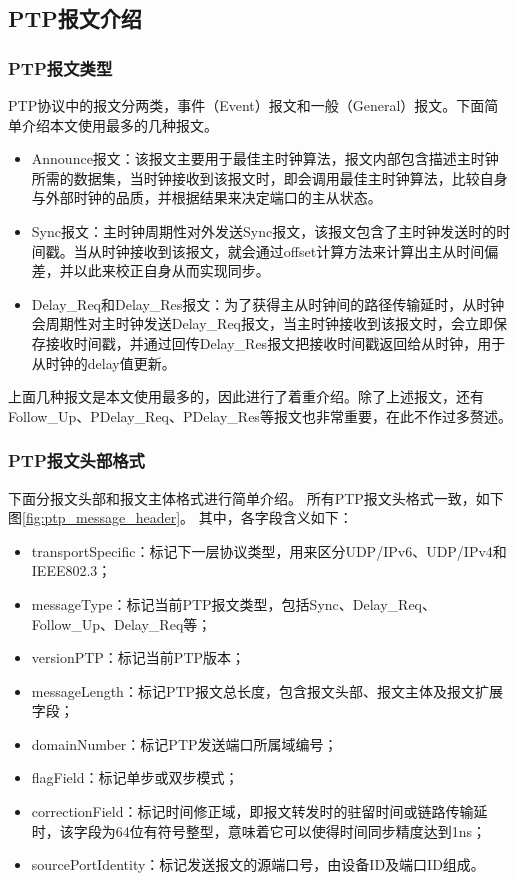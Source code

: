 \subsection{PTP报文介绍}
\subsubsection{PTP报文类型}
PTP协议中的报文分两类，事件（Event）报文和一般（General）报文。下面简单介绍本文使用最多的几种报文。
\begin{itemize}[noitemsep,topsep=0pt,parsep=0pt,partopsep=0pt]
	\item Announce报文：该报文主要用于最佳主时钟算法，报文内部包含描述主时钟所需的数据集，当时钟接收到该报文时，即会调用最佳主时钟算法，比较自身与外部时钟的品质，并根据结果来决定端口的主从状态\supercite{52}。
	\item Sync报文：主时钟周期性对外发送Sync报文，该报文包含了主时钟发送时的时间戳。当从时钟接收到该报文，就会通过offset计算方法来计算出主从时间偏差，并以此来校正自身从而实现同步\supercite{52}。
	\item Delay\_Req和Delay\_Res报文：为了获得主从时钟间的路径传输延时，从时钟会周期性对主时钟发送Delay\_Req报文，当主时钟接收到该报文时，会立即保存接收时间戳，并通过回传Delay\_Res报文把接收时间戳返回给从时钟，用于从时钟的delay值更新\supercite{52}。
\end{itemize}
上面几种报文是本文使用最多的，因此进行了着重介绍。除了上述报文，还有Follow\_Up、PDelay\_Req、PDelay\_Res等报文也非常重要，在此不作过多赘述。

\subsubsection{PTP报文头部格式}
下面分报文头部和报文主体格式进行简单介绍。
所有PTP报文头格式一致，如下图\ref{fig:ptp_message_header}。
其中，各字段含义如下：
\begin{itemize}[noitemsep,topsep=0pt,parsep=0pt,partopsep=0pt]
	\item transportSpecific：标记下一层协议类型，用来区分UDP/IPv6、UDP/IPv4和IEEE802.3；
	\item messageType：标记当前PTP报文类型，包括Sync、Delay\_Req、Follow\_Up、Delay\_Req等；
	\item versionPTP：标记当前PTP版本；
	\item messageLength：标记PTP报文总长度，包含报文头部、报文主体及报文扩展字段；
	\item domainNumber：标记PTP发送端口所属域编号；
	\item flagField：标记单步或双步模式；
	\item correctionField：标记时间修正域，即报文转发时的驻留时间或链路传输延时，该字段为64位有符号整型，意味着它可以使得时间同步精度达到1ns；
	\item sourcePortIdentity：标记发送报文的源端口号，由设备ID及端口ID组成。
\end{itemize}

